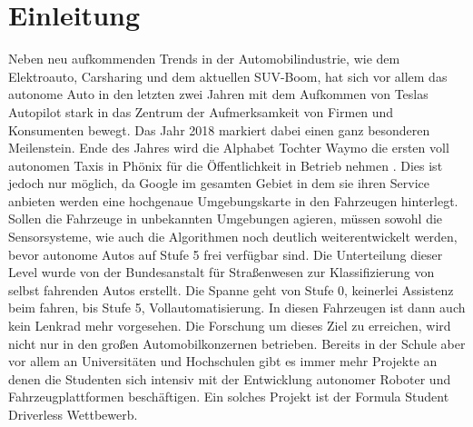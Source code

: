 \documentclass{like}
\begin{document}
  








\setcounter{page}{1}   %

\chapter{Einleitung}
Neben neu aufkommenden Trends in der Automobilindustrie, wie dem Elektroauto, Carsharing und dem aktuellen SUV-Boom, hat sich vor allem das autonome Auto in den letzten zwei Jahren mit dem Aufkommen von Teslas Autopilot stark in das Zentrum der Aufmerksamkeit von Firmen und Konsumenten bewegt. Das Jahr 2018 markiert dabei einen ganz besonderen Meilenstein. 
Ende des Jahres wird die Alphabet Tochter Waymo die ersten voll autonomen Taxis in Phönix für die Öffentlichkeit in Betrieb nehmen \cite{Waymo:1}. 
Dies ist jedoch nur möglich, da Google im gesamten Gebiet in dem sie ihren Service anbieten werden eine hochgenaue Umgebungskarte in den Fahrzeugen hinterlegt. Sollen die Fahrzeuge in unbekannten Umgebungen agieren, müssen sowohl die Sensorsysteme, wie auch die Algorithmen noch deutlich weiterentwickelt werden, bevor autonome Autos auf Stufe 5 frei verfügbar sind. Die Unterteilung dieser Level wurde von der Bundesanstalt für Straßenwesen zur Klassifizierung von selbst fahrenden Autos erstellt. Die Spanne geht von Stufe 0, keinerlei Assistenz beim fahren, bis Stufe 5, Vollautomatisierung. In diesen Fahrzeugen ist dann auch kein Lenkrad mehr vorgesehen. 
Die Forschung um dieses Ziel zu erreichen, wird nicht nur in den großen Automobilkonzernen betrieben. Bereits in der Schule aber vor allem an Universitäten und Hochschulen gibt es immer mehr Projekte an denen die Studenten sich intensiv mit der Entwicklung autonomer Roboter und Fahrzeugplattformen beschäftigen. Ein solches Projekt ist der Formula Student Driverless Wettbewerb.
\end{document}
